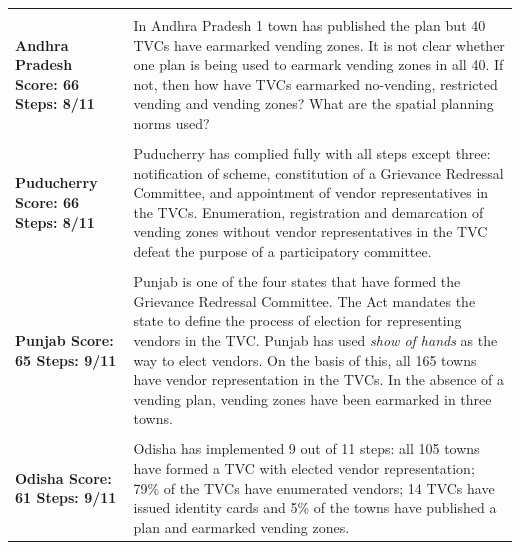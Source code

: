 \documentclass[a4paper, 12pt, twoside, table]{article}
\begin{document}
{\begin{longtable}[l]{>{\raggedright}p{3cm}>{\raggedright\arraybackslash}p{12cm}}
\cellcolor{SVACgreen3} & \cellcolor{SVACgreen2} \\

\cellcolor{SVACgreen3}\bf{Andhra Pradesh}
\newline
\bf{Score: 66}
\newline
\bf{Steps: 8/11} & \cellcolor{SVACgreen2}In Andhra Pradesh 1 town has published the plan but 40 TVCs have earmarked vending zones. It is not clear whether one plan is being used to earmark vending zones in all 40. If not, then how have TVCs earmarked no-vending, restricted vending and vending zones? What are the spatial planning norms used? \\

\cellcolor{SVACgreen3} & \cellcolor{SVACgreen2} \\

\cellcolor{SVACgreen3}\bf{Puducherry}
\newline
\bf{Score: 66}
\newline
\bf{Steps: 8/11} & \cellcolor{SVACgreen2}Puducherry has complied fully with all steps except three: notification of scheme, constitution of a Grievance Redressal Committee, and appointment of vendor representatives in the TVCs. Enumeration, registration and demarcation of vending zones without vendor representatives in the TVC defeat the purpose of a participatory committee.\\
\cellcolor{SVACgreen3} & \cellcolor{SVACgreen2} \\

\cellcolor{SVACgreen3}\bf{Punjab}
\newline
\bf{Score: 65}
\newline
\bf{Steps: 9/11} & \cellcolor{SVACgreen2}Punjab is one of the four states that have formed the Grievance Redressal Committee. The Act mandates the state to define the process of election for representing vendors in the TVC. Punjab has used \textit{show of hands} as the way to elect vendors. On the basis of  this, all 165 towns have vendor representation in the TVCs. In the absence of a vending plan, vending zones have been earmarked in three towns. \\

\cellcolor{SVACgreen3} & \cellcolor{SVACgreen2} \\

\cellcolor{SVACgreen3}\bf{Odisha}
\newline
\bf{Score: 61}
\newline
\bf{Steps: 9/11} & \cellcolor{SVACgreen2}Odisha has implemented 9 out of 11 steps: all 105 towns have formed a TVC with elected vendor representation; 79\% of the TVCs have enumerated vendors; 14 TVCs have issued identity cards and 5\% of the towns have published a plan and earmarked vending zones. \\


\end{longtable}}
\end{document}
